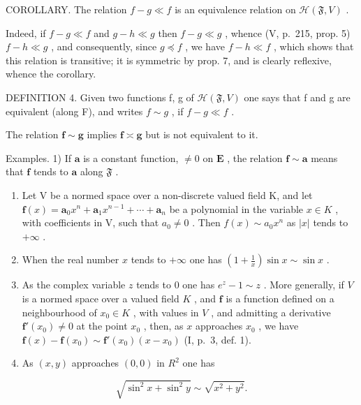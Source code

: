 COROLLARY. The relation \(f - g \ll f\) is an equivalence relation on \(\mathcal{H}(\mathfrak{F}, V)\) .

Indeed, if \(f - g \ll f\) and \(g - h \ll g\) then \(f - g \ll g\) , whence (V, p.~215, prop. 5) \(f - h \ll g\) , and consequently, since \(g \preccurlyeq f\) , we have \(f - h \ll f\) , which shows that this relation is transitive; it is symmetric by prop. 7, and is clearly reflexive, whence the corollary.

DEFINITION 4. Given two functions f, g of \(\mathcal{H}(\mathfrak{F}, V)\) one says that f and g are equivalent (along F), and writes \(f \sim g\) , if \(f - g \ll f\) .

The relation \(\mathbf{f} \sim \mathbf{g}\) implies \(\mathbf{f} \asymp \mathbf{g}\) but is not equivalent to it.

Examples. 1) If \(\mathbf{a}\) is a constant function, \(\neq 0\) on \(\mathbf{E}\) , the relation \(\mathbf{f} \sim \mathbf{a}\) means that \(\mathbf{f}\) tends to \(\mathbf{a}\) along \(\mathfrak{F}\) .

\begin{enumerate}
\def\labelenumi{\arabic{enumi})}
\setcounter{enumi}{1}
\item
  Let V be a normed space over a non-discrete valued field K, and let \(\mathbf{f}(x)=\mathbf{a}_{0}x^{n}+\mathbf{a}_{1}x^{n-1}+\cdots+\mathbf{a}_{n}\) be a polynomial in the variable \(x\in K\) , with coefficients in V, such that \(a_{0}\neq0\) . Then \(f(x)\sim a_{0}x^{n}\) as \(|x|\) tends to \(+\infty\) .
\item
  When the real number \(x\) tends to \(+\infty\) one has \(\left(1 + \frac{1}{x}\right)\sin x \sim \sin x\) .
\item
  As the complex variable \(z\) tends to 0 one has \(e^z - 1 \sim z\) . More generally, if \(V\) is a normed space over a valued field \(K\) , and \(\mathbf{f}\) is a function defined on a neighbourhood of \(x_0 \in K\) , with values in \(V\) , and admitting a derivative \(\mathbf{f}'(x_0) \neq 0\) at the point \(x_0\) , then, as \(x\) approaches \(x_0\) , we have \(\mathbf{f}(x) - \mathbf{f}(x_0) \sim \mathbf{f}'(x_0)(x - x_0)\) (I, p.~3, def. 1).
\item
  As \((x, y)\) approaches \((0, 0)\) in \(R^{2}\) one has
\end{enumerate}

\[
\sqrt {\sin^ {2} x + \sin^ {2} y} \sim \sqrt {x ^ {2} + y ^ {2}}.
\]

